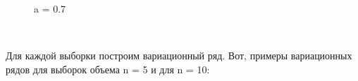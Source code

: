 \documentclass[a4paper,12pt, oneside]{book}
\begin{document}
\begin{figure}[h!]
\begin{center}
		\vfill
		\begin{minipage}[h]{0.47\linewidth}
			 a = 0.7 \\
		\end{minipage}
	\end{center}
\end{figure}

\newpage
\vspace{5mm}
\\
\vspace{5mm}



Для каждой выборки построим вариационный ряд. Вот, примеры вариационных рядов для выборок объема n = 5 и для n = 10:
\end{document}
